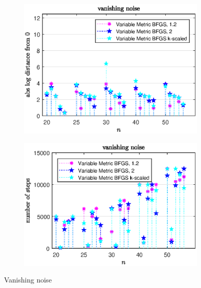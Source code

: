 \begin{figure}[H]
	\begin{subfigure}{0.49\textwidth}
		\includegraphics[width=\textwidth]{Pictures/Plots/vanishing_noise_compb.eps}%
	\end{subfigure}
	\begin{subfigure}{0.49\textwidth}
		\includegraphics[width=\textwidth]{Pictures/Plots/steps_vanishing_noise_compb.eps}%
	\end{subfigure}
	\caption{Vanishing noise}%
	\label{fig_van_noise_comp_large}%
\end{figure}

